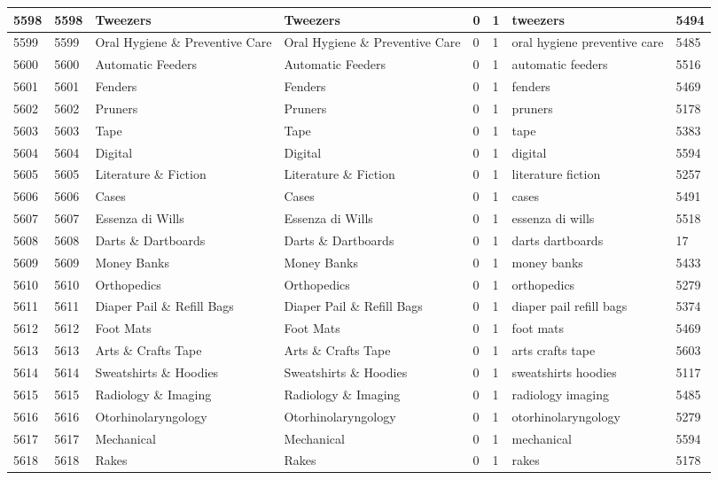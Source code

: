 \begin{longtable}{|l|l|l|l|l|l|l|l|}
5598 & 5598 & Tweezers & Tweezers & 0 & 1 & tweezers & 5494 \\ \hline 
5599 & 5599 & Oral Hygiene \& Preventive Care & Oral Hygiene \& Preventive Care & 0 & 1 & oral hygiene preventive care & 5485 \\ \hline 
5600 & 5600 & Automatic Feeders & Automatic Feeders & 0 & 1 & automatic feeders & 5516 \\ \hline 
5601 & 5601 & Fenders & Fenders & 0 & 1 & fenders & 5469 \\ \hline 
5602 & 5602 & Pruners & Pruners & 0 & 1 & pruners & 5178 \\ \hline 
5603 & 5603 & Tape & Tape & 0 & 1 & tape & 5383 \\ \hline 
5604 & 5604 & Digital & Digital & 0 & 1 & digital & 5594 \\ \hline 
5605 & 5605 & Literature \& Fiction & Literature \& Fiction & 0 & 1 & literature fiction & 5257 \\ \hline 
5606 & 5606 & Cases & Cases & 0 & 1 & cases & 5491 \\ \hline 
5607 & 5607 & Essenza di Wills & Essenza di Wills & 0 & 1 & essenza di wills & 5518 \\ \hline 
5608 & 5608 & Darts \& Dartboards & Darts \& Dartboards & 0 & 1 & darts dartboards & 17 \\ \hline 
5609 & 5609 & Money Banks & Money Banks & 0 & 1 & money banks & 5433 \\ \hline 
5610 & 5610 & Orthopedics & Orthopedics & 0 & 1 & orthopedics & 5279 \\ \hline 
5611 & 5611 & Diaper Pail \& Refill Bags & Diaper Pail \& Refill Bags & 0 & 1 & diaper pail refill bags & 5374 \\ \hline 
5612 & 5612 & Foot Mats & Foot Mats & 0 & 1 & foot mats & 5469 \\ \hline 
5613 & 5613 & Arts \& Crafts Tape & Arts \& Crafts Tape & 0 & 1 & arts crafts tape & 5603 \\ \hline 
5614 & 5614 & Sweatshirts \& Hoodies & Sweatshirts \& Hoodies & 0 & 1 & sweatshirts hoodies & 5117 \\ \hline 
5615 & 5615 & Radiology \& Imaging & Radiology \& Imaging & 0 & 1 & radiology imaging & 5485 \\ \hline 
5616 & 5616 & Otorhinolaryngology & Otorhinolaryngology & 0 & 1 & otorhinolaryngology & 5279 \\ \hline 
5617 & 5617 & Mechanical & Mechanical & 0 & 1 & mechanical & 5594 \\ \hline 
5618 & 5618 & Rakes & Rakes & 0 & 1 & rakes & 5178 \\ \hline 

\end{longtable}
